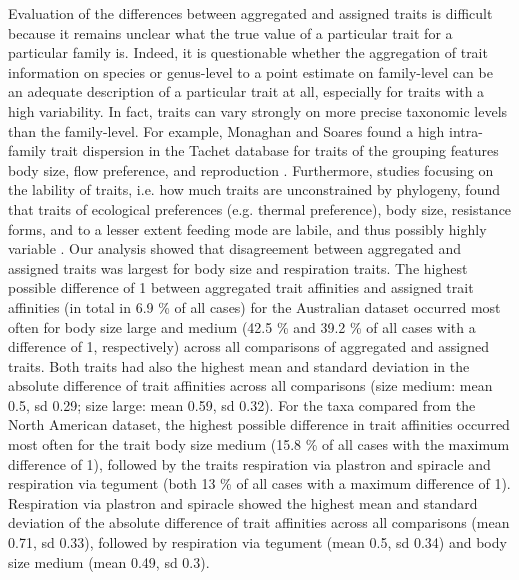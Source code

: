 \documentclass{article}
\begin{document}
Evaluation of the differences between aggregated and assigned traits is difficult because it remains unclear what the true value of a particular trait for a particular family is. Indeed, it is questionable whether the aggregation of trait information on species or genus-level to a point estimate on family-level can be an adequate description of a particular trait at all, especially for traits with a high variability. In fact, traits can vary strongly on more precise taxonomic levels than the family-level. For example, Monaghan and Soares found a high intra-family trait dispersion in the Tachet database for traits of the grouping features body size, flow preference, and reproduction \cite{monaghan_improving_2013}. Furthermore, studies focusing on the lability of traits, i.e. how much traits are unconstrained by phylogeny, found that traits of ecological preferences (e.g. thermal preference), body size, resistance forms, and to a lesser extent feeding mode are labile, and thus possibly highly variable \cite{poff_functional_2006, wilkes_traitbased_2020}. Our analysis showed that disagreement between aggregated and assigned traits was largest for body size and respiration traits. The highest possible difference of 1 between aggregated trait affinities and assigned trait affinities (in total in 6.9 \% of all cases) for the Australian dataset occurred most often for body size large and medium (42.5 \% and 39.2 \% of all cases with a difference of 1, respectively) across all comparisons of aggregated and assigned traits. Both traits had also the highest mean and standard deviation in the absolute difference of trait affinities across all comparisons (size medium: mean 0.5, sd 0.29; size large: mean 0.59, sd 0.32). 
For the taxa compared from the North American dataset, the highest possible difference in trait affinities occurred most often for the trait body size medium (15.8 \% of all cases with the maximum difference of 1), followed by the traits respiration via plastron and spiracle and respiration via tegument (both 13 \% of all cases with a maximum difference of 1). Respiration via plastron and spiracle showed the highest mean and standard deviation of the absolute difference of trait affinities across all comparisons (mean 0.71, sd 0.33), followed by respiration via tegument (mean 0.5, sd 0.34) and body size medium (mean 0.49, sd 0.3). 
\end{document}
